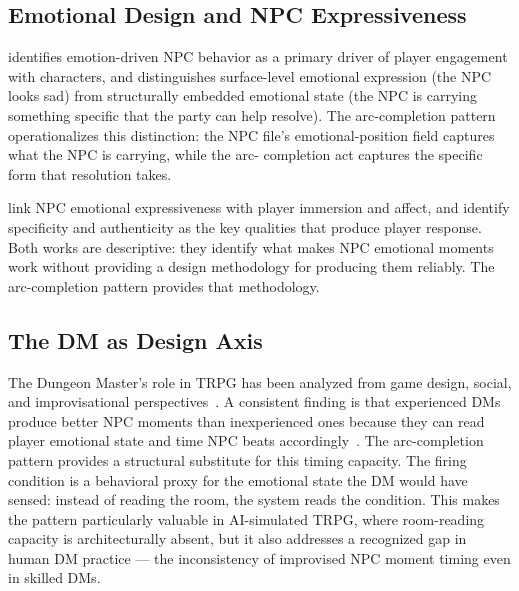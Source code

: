 \subsection{Emotional Design and NPC Expressiveness}

\citet{isbister2006better} identifies emotion-driven NPC behavior as a primary
driver of player engagement with characters, and distinguishes surface-level
emotional expression (the NPC looks sad) from structurally embedded emotional
state (the NPC is carrying something specific that the party can help resolve).
The arc-completion pattern operationalizes this distinction: the NPC file's
emotional-position field captures what the NPC is carrying, while the arc-
completion act captures the specific form that resolution takes.

\citet{mekler2017framework} link NPC emotional expressiveness with player
immersion and affect, and identify specificity and authenticity as the
key qualities that produce player response. Both works are descriptive: they
identify what makes NPC emotional moments work without providing a design
methodology for producing them reliably. The arc-completion pattern provides
that methodology.

\subsection{The DM as Design Axis}

The Dungeon Master's role in TRPG has been analyzed from game design, social,
and improvisational perspectives~\cite{bowman2010functions,
zagal2008collaborative}. A consistent finding is that experienced DMs produce
better NPC moments than inexperienced ones because they can read player
emotional state and time NPC beats accordingly~\cite{harmon2011story}. The
arc-completion pattern provides a structural substitute for this timing
capacity. The firing condition is a behavioral proxy for the emotional state
the DM would have sensed: instead of reading the room, the system reads the
condition. This makes the pattern particularly valuable in AI-simulated TRPG,
where room-reading capacity is architecturally absent, but it also addresses
a recognized gap in human DM practice --- the inconsistency of improvised NPC
moment timing even in skilled DMs.
